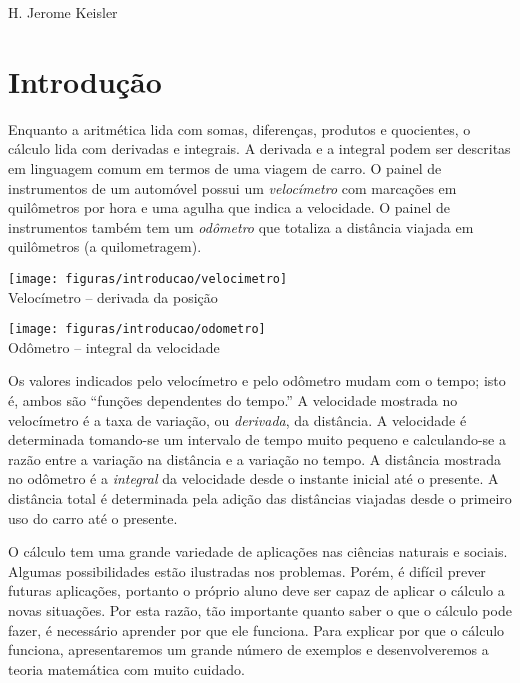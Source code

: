 \documentclass{svmono}
\begin{document}
\hfill H. Jerome Keisler

\tableofcontents

\chapter*{Introdução}

Enquanto a aritmética lida com somas, diferenças, produtos e quocientes, o
cálculo lida com derivadas e integrais. A derivada e a integral podem
ser descritas em linguagem comum em termos de uma viagem de carro. O
painel de instrumentos de um automóvel possui um \emph{velocímetro}
com marcações em quilômetros por hora e uma agulha que indica a velocidade.
O painel de instrumentos também tem um \emph{odômetro} que totaliza a
distância viajada em quilômetros (a quilometragem).

\vspace{0.5\baselineskip}
\begin{minipage}{0.5\textwidth}
\begin{center}
\texttt{[image: figuras/introducao/velocimetro]}\\
Velocímetro -- derivada da posição
\end{center}
\end{minipage}%
\begin{minipage}{0.5\textwidth}
\begin{center}
\texttt{[image: figuras/introducao/odometro]}\\
Odômetro -- integral da velocidade
\end{center}
\end{minipage}
\vspace{0.5\baselineskip}

Os valores indicados pelo velocímetro e pelo odômetro mudam com o tempo;
isto é, ambos são ``funções dependentes do tempo.'' A velocidade mostrada
no velocímetro é a taxa de variação, ou \emph{derivada}, da distância.
A velocidade é determinada tomando-se um intervalo de tempo muito
pequeno e calculando-se a razão entre a variação na distância e a
variação no tempo. A distância mostrada no odômetro é a
\emph{integral} da velocidade desde o instante inicial até o presente. 
A distância total é determinada pela adição das distâncias viajadas desde
o primeiro uso do carro até o presente.

O cálculo tem uma grande variedade de aplicações nas ciências naturais e
sociais. Algumas possibilidades estão ilustradas nos problemas.
Porém, é difícil prever futuras aplicações, portanto o próprio aluno
deve ser capaz de aplicar o cálculo a novas situações. Por esta razão, tão
importante quanto saber o que o cálculo pode fazer, é necessário aprender
por que ele funciona.
Para explicar por que o cálculo funciona, apresentaremos um grande número
de exemplos e desenvolveremos a teoria matemática com muito cuidado.
\end{document}
